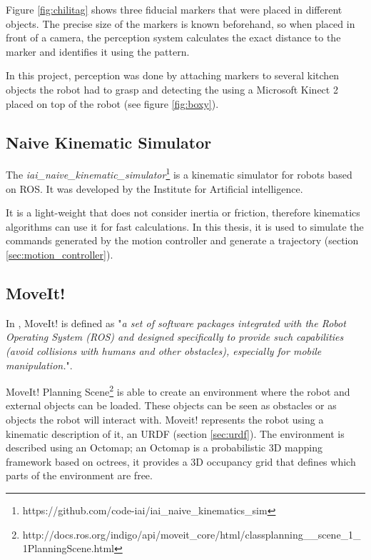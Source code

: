 Figure \ref{fig:chilitag} shows three fiducial markers that were placed in different objects. The precise size of the markers is known beforehand, so when placed in front of a camera, the perception system calculates the exact distance to the marker and identifies it using the pattern.

In this project, perception was done by attaching markers to several kitchen objects the robot had to grasp and detecting the using a Microsoft Kinect 2 placed on top of the robot (see figure \ref{fig:boxy}).

\subsection{Naive Kinematic Simulator}
\label{sub:naive}
The \textit{iai\_naive\_kinematic\_simulator}\footnote{https://github.com/code-iai/iai\_naive\_kinematics\_sim} is a kinematic simulator for robots based on ROS. It was developed by the Institute for Artificial intelligence.

It is a light-weight that does not consider inertia or friction, therefore kinematics algorithms can use it for fast calculations. In this thesis, it is used to simulate the commands generated by the motion controller and generate a trajectory (section \ref{sec:motion_controller}).

\subsection{MoveIt!}
\label{subsec:moveit}

In \citet{moveit}, MoveIt! is defined as "\textit{a set of software	packages integrated with the Robot Operating System (ROS) and designed specifically to provide such capabilities (avoid collisions with humans and other obstacles), especially for mobile manipulation.}".

MoveIt! Planning Scene\footnote{http://docs.ros.org/indigo/api/moveit\_core/html/classplanning\_\_scene\_1\_1PlanningScene.html} is able to create an environment where the robot and external objects can be loaded. These objects can be seen as obstacles or as objects the robot will interact with. Moveit! represents the robot using a kinematic description of it, an URDF (section \ref{sec:urdf}). The environment is described using an Octomap; an Octomap is a probabilistic 3D mapping framework based on octrees, it provides a 3D occupancy grid that defines which parts of the environment are free.

